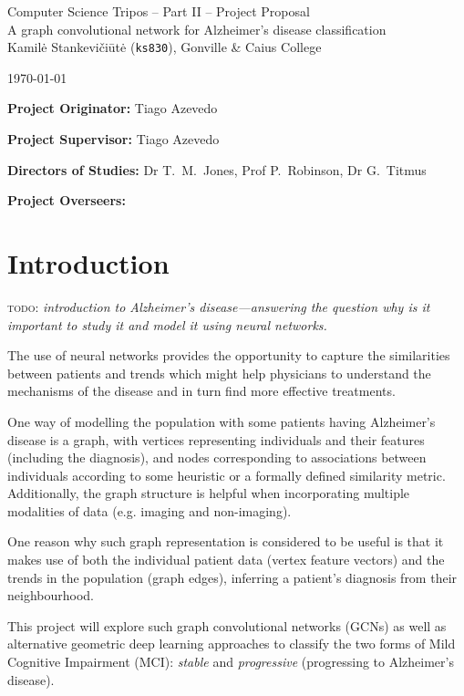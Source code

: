 \documentclass[12pt,a4paper,twoside]{article}
\begin{document}
\begin{center}
\Large
Computer Science Tripos -- Part II -- Project Proposal\\[4mm]
\LARGE
A graph convolutional network for Alzheimer's disease classification\\[4mm]

\large
Kamilė Stankevičiūtė (\texttt{ks830}), Gonville \& Caius College

\today %
\end{center}

\vspace{5mm}
\textbf{Project Originator:} Tiago Azevedo

\textbf{Project Supervisor:} Tiago Azevedo

\textbf{Directors of Studies:} Dr T.~M.~Jones, Prof P.~Robinson, Dr G.~Titmus

\textbf{Project Overseers:} 


\section*{Introduction}

\textsc{todo:} \textit{introduction to Alzheimer's disease—answering the question why is it important to study it and model it using neural networks.}

The use of neural networks provides the opportunity to capture the similarities between patients and trends which might help physicians to understand the mechanisms of the disease and in turn find more effective treatments. 

One way of modelling the population with some patients having Alzheimer's disease is a graph, with vertices representing individuals and their features (including the diagnosis), and nodes corresponding to associations between individuals according to some heuristic or a formally defined similarity metric. Additionally, the graph structure is helpful when incorporating multiple modalities of data (e.g. imaging and non-imaging).

One reason why such graph representation is considered to be useful is that it makes use of both the individual patient data (vertex feature vectors) and the trends in the population (graph edges), inferring a patient's diagnosis from their neighbourhood. 

This project will explore such graph convolutional networks (GCNs) as well as alternative geometric deep learning approaches to classify the two forms of Mild Cognitive Impairment (MCI): \textit{stable} and \textit{progressive} (progressing to Alzheimer's disease).
\end{document}

